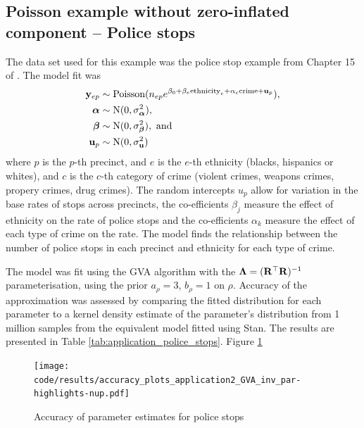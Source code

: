 			\subsection{Poisson example without zero-inflated component -- Police stops}
			The data set used for this example was the police stop example from Chapter 15 of \citep{Gelman2007}.
			The model fit was
			\begin{align*}
				{\bf y}_{ep}        & \sim \text{Poisson}(n_{ep} e^{\beta_0 + \beta_e \text{ethnicity}_e + \alpha_{c} \text{crime} + {\bf u}_p}), \\
				{\boldsymbol \alpha}				& \sim \text{N}(0, \sigma_{\boldsymbol \alpha}^2),	\\
				{\boldsymbol \beta}        & \sim \text{N}(0, \sigma_{\boldsymbol \beta}^2), \text{ and }\\
				{\bf u}_p         & \sim \text{N}(0, \sigma_{\bf u}^2)
			\end{align*}
			where $p$ is the $p$-th precinct, and $e$ is the $e$-th ethnicity (blacks, hispanics or whites), and $c$ is
			the $c$-th category of crime (violent crimes, weapons crimes, propery crimes, drug crimes). The random 
			intercepts $u_p$ allow for variation in the base rates of stops across precincts,
			the co-efficients $\beta_j$ measure the effect of ethnicity on the rate of police stops and
			the co-efficients $\alpha_k$ measure the effect of each type of crime on the rate.
			The model finds the relationship between the number of police stops in each precinct and 
			ethnicity	for each type of crime.
			
			The model was fit using the GVA algorithm with the ${\boldsymbol \Lambda} = ({\bf R}^\top {\bf R})^{-1}$ parameterisation, using
			the prior $a_\rho = 3$, $b_\rho = 1$ on $\rho$. Accuracy of the approximation was assessed by comparing the
			fitted distribution for each parameter to a kernel density estimate of the parameter's distribution from
			1 million samples from the equivalent model fitted using Stan. The results are presented in Table
			\ref{tab:application_police_stops}. Figure \ref{fig:police_stops}
			
			\begin{figure}
			\texttt{[image: code/results/accuracy\_plots\_application2\_GVA\_inv\_par-highlights-nup.pdf]}
			\caption{Accuracy of parameter estimates for police stops}
			\label{fig:police_stops}
			\end{figure}

